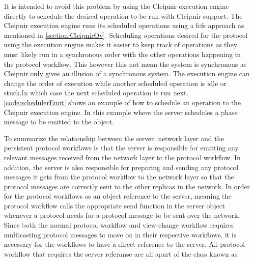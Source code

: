 It is intended to avoid this problem by using the Cleipnir execution engine directly to schedule the desired operation to be run with Cleipnir support. The Cleipnir execution engine runs its scheduled operations using a \ac{fcfs} approach as mentioned in \autoref{section:CleipnirOv}. Scheduling operations desired for the protocol using the execution engine makes it easier to keep track of operations as they must likely run in a synchronous order with the other operations happening in the protocol workflow. This however this not mean the system is synchronous as Cleipnir only gives an illusion of a synchronous system. The execution engine can change the order of execution while another scheduled operation is idle or stuck.In which case the next scheduled operation is run next. \autoref{code:schedulerEmit} shows an example of how to schedule an operation to the Cleipnir execution engine. In this example where the server schedules a phase message to be emitted to the   object.

To summarize the relationship between the server, network layer and the persistent protocol workflows is that the server is responsible for emitting any relevant messages received from the network layer to the protocol workflow. In addition, the server is also responsible for preparing and sending any protocol messages it gets from the protocol workflow to the network layer so that the protocol messages are correctly sent to the other replicas in the network. In order for the protocol workflows as an object reference to the server, meaning the protocol workflow calls the appropriate send function in the server object whenever a protocol needs for a protocol message to be sent over the network. Since both the normal protocol workflow and view-change workflow requires multicasting protocol messages to move on in their respective workflows, it is necessary for the workflows to have a direct reference to the server. All protocol workflow that requires the server referanse are all apart of the class known as  

